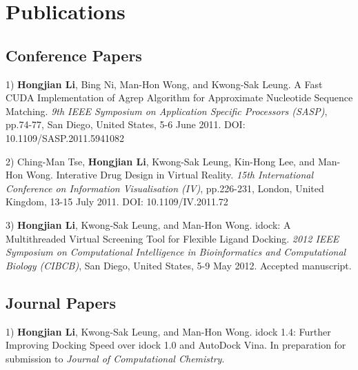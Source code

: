\chapter{Publications}

\section{Conference Papers}

1) \textbf{Hongjian Li}, Bing Ni, Man-Hon Wong, and Kwong-Sak Leung. A Fast CUDA Implementation of Agrep Algorithm for Approximate Nucleotide Sequence Matching. \textit{9th IEEE Symposium on Application Specific Processors (SASP)}, pp.74-77, San Diego, United States, 5-6 June 2011. DOI: 10.1109/SASP.2011.5941082

2) Ching-Man Tse, \textbf{Hongjian Li}, Kwong-Sak Leung, Kin-Hong Lee, and Man-Hon Wong. Interative Drug Design in Virtual Reality. \textit{15th International Conference on Information Visualisation (IV)}, pp.226-231, London, United Kingdom, 13-15 July 2011. DOI: 10.1109/IV.2011.72

3) \textbf{Hongjian Li}, Kwong-Sak Leung, and Man-Hon Wong. idock: A Multithreaded Virtual Screening Tool for Flexible Ligand Docking. \textit{2012 IEEE Symposium on Computational Intelligence in Bioinformatics and Computational Biology (CIBCB)}, San Diego, United States, 5-9 May 2012. Accepted manuscript.

\section{Journal Papers}

1) \textbf{Hongjian Li}, Kwong-Sak Leung, and Man-Hon Wong. idock 1.4: Further Improving Docking Speed over idock 1.0 and AutoDock Vina. In preparation for submission to \textit{Journal of Computational Chemistry}.

\chapterend

